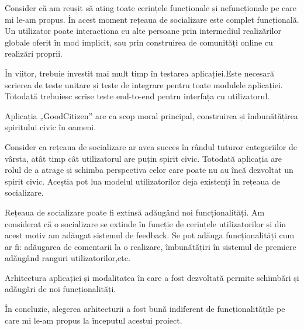 Consider că am reușit să ating toate cerințele funcționale și nefuncționale pe care mi le-am
propus. În acest moment rețeaua de socializare este complet funcțională. Un utilizator poate 
interacționa cu alte persoane prin intermediul realizărilor globale oferit în mod implicit, sau
prin construirea de comunități online cu realizări proprii.

În viitor, trebuie investit mai mult timp în testarea aplicației.Este necesară scrierea de teste unitare și
teste de integrare pentru toate modulele aplicației. Totodată trebuiesc scrise teste end-to-end pentru 
interfața cu utilizatorul.  

Aplicația „GoodCitizen” are ca scop moral principal, construirea și îmbunătățirea spiritului civic în oameni.

Consider ca rețeaua de socializare ar avea succes în rândul tuturor categoriilor de vârsta, atât timp 
cât utilizatorul are puțin spirit civic. Totodată aplicația are rolul de a atrage și schimba perspectiva
celor care poate nu au încă dezvoltat un spirit civic. Aceștia pot lua modelul utilizatorilor deja existenți 
în rețeaua de socializare.

Rețeaua de socializare poate fi extinsă adăugând noi funcționalități. Am considerat că o socializare 
se extinde în funcție de cerințele utilizatorilor și din acest motiv am adăugat sistemul de feedback.
Se pot adăuga funcționalități cum ar fi: adăugarea de comentarii la o realizare, îmbunătățiri în 
sistemul de premiere adăugând ranguri utilizatorilor,etc. 

Arhitectura aplicației și modalitatea în care a fost dezvoltată permite schimbări și adăugări de noi 
funcționalități.

În concluzie, alegerea arhitecturii a fost bună indiferent de funcționalitățile pe care mi le-am 
propus la începutul acestui proiect.